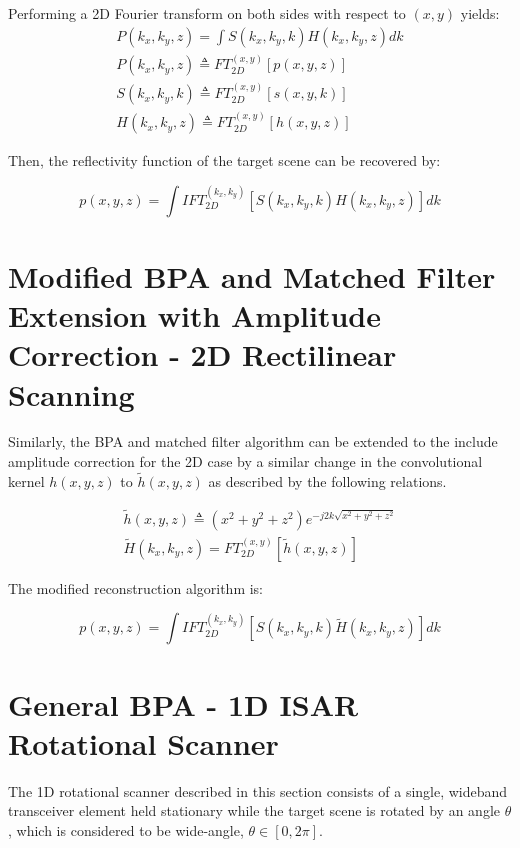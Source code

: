 \documentclass[conference]{IEEEtran}
\begin{document}
Performing a 2D Fourier transform on both sides with respect to $(x,y)$ yields:
\begin{gather}
	P(k_x,k_y,z) = \int S(k_x,k_y,k)H(k_x,k_y,z) dk \\
	P(k_x,k_y,z) \triangleq FT_{2D}^{(x,y)}\left[ p(x,y,z) \right] \\
	S(k_x,k_y,k) \triangleq FT_{2D}^{(x,y)}\left[ s(x,y,k) \right] \\
	H(k_x,k_y,z) \triangleq FT_{2D}^{(x,y)}\left[ h(x,y,z) \right] 
\end{gather}

Then, the reflectivity function of the target scene can be recovered by:

\begin{equation}
	p(x,y,z) = \int IFT_{2D}^{(k_x,k_y)}\left[ S(k_x,k_y,k)H(k_x,k_y,z) \right] dk
\end{equation}

\section{Modified BPA and Matched Filter Extension with Amplitude Correction - 2D Rectilinear Scanning}

Similarly, the BPA and matched filter algorithm can be extended to the include amplitude correction for the 2D case by a similar change in the convolutional kernel $h(x,y,z)$ to $\tilde{h}(x,y,z)$ as described by the following relations.

\begin{gather}
	\tilde{h}(x,y,z) \triangleq (x^2 + y^2 + z^2)e^{-j2k\sqrt{x^2 + y^2 + z^2}} \\
	\tilde{H}(k_x,k_y,z) = FT_{2D}^{(x,y)}[\tilde{h}(x,y,z)]
\end{gather}

The modified reconstruction algorithm is:

\begin{equation}
p(x,y,z) = \int IFT_{2D}^{(k_x,k_y)}\left[ S(k_x,k_y,k)\tilde{H}(k_x,k_y,z) \right] dk
\end{equation}

\section{General BPA - 1D ISAR Rotational Scanner}
The 1D rotational scanner described in this section consists of a single, wideband transceiver element held stationary while the target scene is rotated by an angle $\theta$, which is considered to be wide-angle, $\theta \in [0,2\pi]$.
\end{document}
